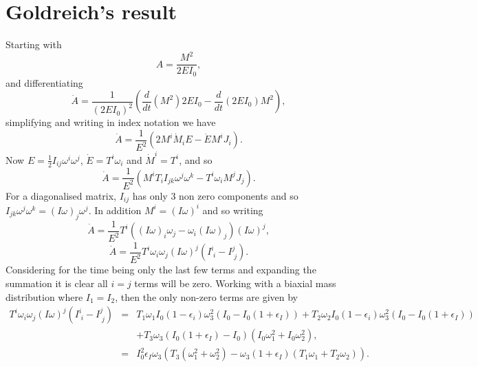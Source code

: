 \section{Goldreich's result}
\label{sec: goldreich}
Starting with 
\begin{equation}
A=\frac{M^{2}}{2EI_{0}},
\end{equation}
and differentiating
\begin{equation}
\dot{A}=\frac{1}{(2EI_{0})^{2}}
        \left(\frac{d}{dt}(M^{2})2EI_{0}-\frac{d}{dt}(2EI_{0})M^{2}\right),
\end{equation}
simplifying and writing in index notation we have
\begin{equation}
\dot{A}=\frac{1}{E^{2}}\left(2M^{i}\dot{M}_{i}E-\dot{E}M^{i}J_{i}\right).
\end{equation}
Now $E=\frac{1}{2}I_{ij}\omega^{i}\omega^{j}$,  $\dot{E}=T^{i}\omega_{i}$ and
$\dot{M}^{i}=T^{i}$, and so
\begin{equation}
\dot{A}=\frac{1}{E^{2}}\left(M^{i}T_{i}I_{jk}\omega^{j}\omega^{k}
                             -T^{i}\omega_{i}M^{j}J_{j}\right).
\end{equation}
For a diagonalised matrix, $I_{ij}$ has only 3 non zero components and so
$I_{jk}\omega^{j}\omega^{k}=(I\omega)_{j}\omega^{j}$. In addition
$M^{i}=(I\omega)^{i}$ and so writing
\begin{equation}
\dot{A}=\frac{1}{E^{2}}T^{i}\left((I\omega)_{i}\omega_{j}
        -\omega_{i}(I\omega)_{j}\right)(I\omega)^{j},
\end{equation}
\begin{equation}
\dot{A}=\frac{1}{E^{2}}T^{i}\omega_{i}\omega_{j}
        (I\omega)^{j}\left(I^{i}_{\;i}-I^{j}_{\;j}\right).
\end{equation}
Considering for the time being only the last few terms and expanding the
summation it is clear all $i=j$ terms will be zero. Working with a biaxial mass
distribution where $I_{1}=I_{2}$, then the only non-zero terms are given by 
\begin{eqnarray*}
T^{i}\omega_{i}\omega_{j}(I\omega)^{j}\left(I^{i}_{\;i}-I^{j}_{\;j}\right)&=&
T_{1}\omega_{1}I_{0}(1-\epsilon_{i})\omega^{2}_{3}
(I_{0}-I_{0}(1+\epsilon_{I}))+
T_{2}\omega_{2}I_{0}(1-\epsilon_{i})\omega^{2}_{3}(I_{0}-I_{0}(1+\epsilon_{I})) 
\\ && + 
T_{3}\omega_{3}(I_{0}(1+\epsilon_{I})-I_{0})
               (I_{0}\omega_{1}^{2}+I_{0}\omega_{2}^{2}), \\
&=& I_{0}^{2}\epsilon_{I}\omega_{3}\left(T_{3}(\omega_{1}^{2}+\omega_{2}^{2}) 
    - \omega_{3}(1+\epsilon_{I})(T_{1}\omega_{1}+T_{2}\omega_{2})\right).
\end{eqnarray*}
